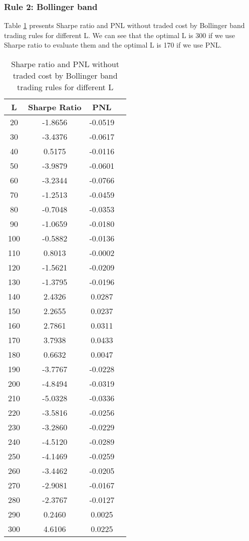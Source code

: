 \documentclass[11pt]{article}
\begin{document}
\subsubsection{Rule 2: Bollinger band}
Table \ref{BB_notc} presents Sharpe ratio and PNL without traded cost by Bollinger band trading rules for different L. We can see that the optimal L is 300 if we use Sharpe ratio to evaluate them and the optimal L is 170 if we use PNL.
\begin{table}[ht]
\centering
\begin{tabular}{cccc}
  \hline
 L & Sharpe Ratio & PNL \\ 
  \hline
20 & -1.8656 & -0.0519 \\ 
     30 & -3.4376 & -0.0617 \\ 
     40 & 0.5175 & -0.0116 \\ 
     50 & -3.9879 & -0.0601 \\ 
     60 & -3.2344 & -0.0766 \\ 
     70 & -1.2513 & -0.0459 \\ 
     80 & -0.7048 & -0.0353 \\ 
     90 & -1.0659 & -0.0180 \\ 
    100 & -0.5882 & -0.0136 \\ 
    110 & 0.8013 & -0.0002 \\ 
    120 & -1.5621 & -0.0209 \\ 
    130 & -1.3795 & -0.0196 \\ 
    140 & 2.4326 & 0.0287 \\ 
    150 & 2.2655 & 0.0237 \\ 
    160 & 2.7861 & 0.0311 \\ 
    170 & 3.7938 & 0.0433 \\ 
    180 & 0.6632 & 0.0047 \\ 
    190 & -3.7767 & -0.0228 \\ 
    200 & -4.8494 & -0.0319 \\ 
    210 & -5.0328 & -0.0336 \\ 
    220 & -3.5816 & -0.0256 \\ 
    230 & -3.2860 & -0.0229 \\ 
    240 & -4.5120 & -0.0289 \\ 
    250 & -4.1469 & -0.0259 \\ 
    260 & -3.4462 & -0.0205 \\ 
    270 & -2.9081 & -0.0167 \\ 
    280 & -2.3767 & -0.0127 \\ 
    290 & 0.2460 & 0.0025 \\ 
    300 & 4.6106 & 0.0225 \\ 

   \hline
\end{tabular}
\caption{Sharpe ratio and PNL without traded cost by Bollinger band trading rules for different L}\label{BB_notc}
\end{table}
\end{document}
